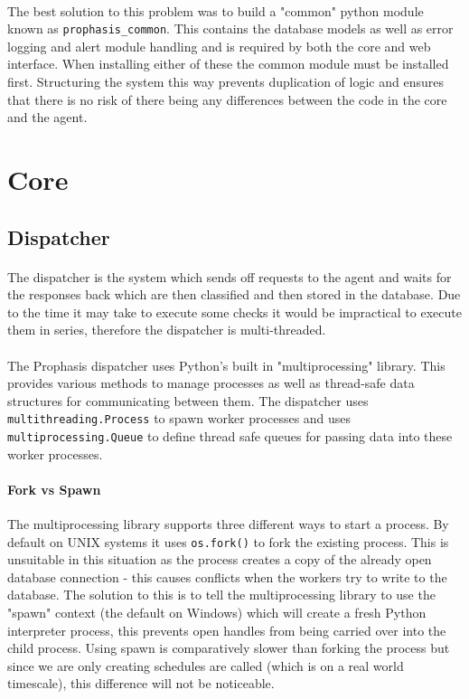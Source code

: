 \documentclass[bsc,logo,twoside,singlespacing,notimes]{infthesis}
\begin{document}
\paragraph*{}
	The best solution to this problem was to build a "common" python module known
	as \texttt{prophasis\_common}.  This contains the database models as well as
	error logging and alert module handling and is required by both the core and
	web interface.  When installing either of these the common module must be
	installed first.  Structuring the system this way prevents duplication of
	logic and ensures that there is no risk of there being any differences between
	the code in the core and the agent.

\section{Core}
\subsection{Dispatcher}
\paragraph*{}
	The dispatcher is the system which sends off requests to the agent and waits
	for the responses back which are then classified and then stored in the
	database.  Due to the time it may take to execute some checks it would be
	impractical to execute them in series, therefore the dispatcher is
	multi-threaded.

\paragraph*{}
	The Prophasis dispatcher uses Python's built in "multiprocessing" library. This
	provides various methods to manage processes as well as thread-safe data
	structures for communicating between them.  The dispatcher uses
	\texttt{multithreading.Process} to spawn worker processes and uses
	\texttt{multiprocessing.Queue} to define thread safe queues for passing data
	into these worker processes.

\paragraph*{Fork vs Spawn}
	The multiprocessing library supports three different ways to start a process.
	By default on UNIX systems it uses \texttt{os.fork()} to fork the existing
	process. This is unsuitable in this situation as the process creates a copy of
	the already open database connection - this causes conflicts when the workers
	try to write to the database.  The solution to this is to tell the
	multiprocessing library to use the "spawn" context (the default on Windows)
	which will create a fresh Python interpreter process, this prevents open
	handles from being carried over into the child process. Using spawn is
	comparatively slower than forking the process but since we are only creating
	schedules are called (which is on a real world timescale), this difference will
	not be noticeable.
\end{document}
